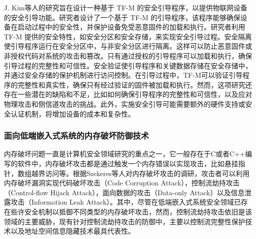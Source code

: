\documentclass[12pt,a4paper]{ctexart}
\numberwithin{figure}{section}
\begin{document}
\par J. Kim等人的研究\cite{secure-bootloader}旨在设计一种基于 TF-M 的安全引导程序，以提供物联网设备的安全引导功能。研究者设计了一个基于 TF-M 的引导程序，该程序能够确保设备在启动过程中的安全性，并保护设备免受恶意固件的加载和执行。研究者利用 TF-M 提供的安全特性，如安全分区和安全存储，来实现安全引导过程。安全隔离使引导程序运行在安全分区中，与非安全分区进行隔离。这样可以防止恶意固件或非授权代码对系统的攻击和篡改。只有通过授权的引导程序可以加载和执行，确保引导过程的完整性和可信性。安全验证使引导程序和关键数据存储在安全存储中，并通过安全存储的保护机制进行访问控制。在引导过程中，TF-M可以验证引导程序的完整性和真实性，确保只有经过验证的固件被加载和执行。然而，这项研究还存在一些潜在的缺陷和不足，比如如何确保引导程序的完整性和可信性，以及应对物理攻击和侧信道攻击的挑战。此外，实施安全引导可能需要额外的硬件支持或安全认证机制，将增加设备的成本和复杂性。

\subsubsection{面向低端嵌入式系统的内存破坏防御技术}
\par 内存破坏问题一直是计算机安全领域研究的重点之一，它一般存在于C或者C++编写的软件中，内存破坏攻击都是通过触发一个内存错误以实现攻击，比如悬挂指针，数组越界访问等。根据Szekeres\cite{6547101}等人对内存破坏攻击的调研，攻击者可以利用内存破坏漏洞实现代码破坏攻击（Code Corruption Attack），控制流劫持攻击（Control-flow Hijack Attack），面向数据的攻击（Data-only Attack）以及信息泄露攻击（Information Leak Attack）。其中，尽管在低端嵌入式系统安全领域已存在些许安全机制以抵御不同类型的内存破坏攻击\cite{7958583,8806725,almakhdhub2020mu}，然而，控制流劫持攻击依旧是该领域的主要威胁，现有针对控制流劫持攻击的防御中，主要以控制流完整性保护技术以及地址空间信息隐藏技术最具代表性。
\end{document}
